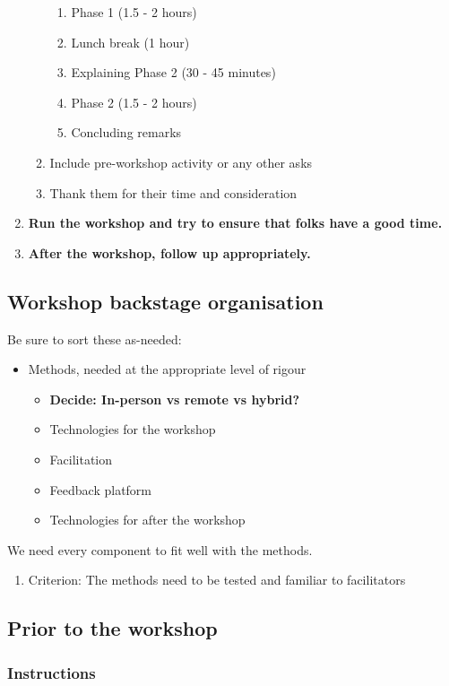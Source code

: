 \documentclass{article}
\begin{document}
\begin{enumerate}
\begin{enumerate}
\begin{enumerate}
\item Phase 1 (1.5 - 2 hours)
\item Lunch break (1 hour)
\item Explaining Phase 2 (30 - 45 minutes)
\item Phase 2 (1.5 - 2 hours)
\item Concluding remarks
\end{enumerate}
\item Include pre-workshop activity or any other asks
\item Thank them for their time and consideration
\end{enumerate}
\item \textbf{Run the workshop and try to ensure that folks have a good time.}
\item \textbf{After the workshop, follow up appropriately.}
\end{enumerate}
\subsection{Workshop backstage organisation}
\label{781d52fa-71a9-4c90-b4f6-9b0dd4244c33}
Be sure to sort these as-needed:

\begin{itemize}
\item Methods, needed at the appropriate level of rigour
\begin{itemize}
\item \textbf{Decide: In-person vs remote vs hybrid?}
\item Technologies for the workshop
\item Facilitation
\item Feedback platform
\item Technologies for after the workshop
\end{itemize}
\end{itemize}

We need every component to fit well with the methods.

\begin{enumerate}
\item Criterion: The methods need to be tested and familiar to facilitators
\end{enumerate}
\subsection{Prior to the workshop}
\label{9accd402-6d28-4ee2-ac35-44b4fe682d53}
\subsubsection{Instructions}
\end{document}
